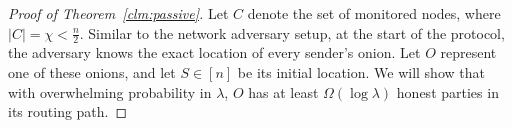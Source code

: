 \begin{proof} [Proof of Theorem~\ref{clm:passive}]

Let $C$ denote the set of monitored nodes, where $|C| = \chi < \frac{n}{2}$. Similar to the network adversary setup, at the start of the protocol, the adversary knows the exact location of every sender's onion. Let $O$ represent one of these onions, and let $S \in [n]$ be its initial location. We will show that with overwhelming probability in $\lambda$, $O$ has at least $\Omega(\log \lambda)$ honest parties in its routing path. 









\end{proof}
